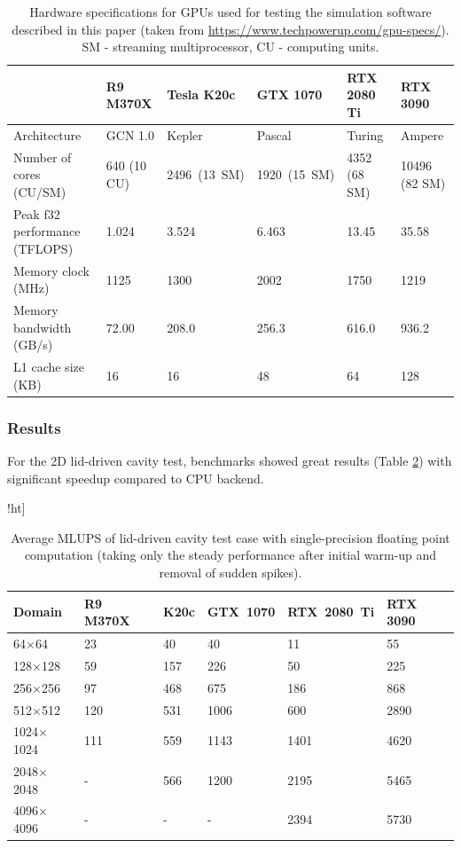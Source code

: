 \begin{table}[!ht]
	\centering
	\begin{tabular}{ |p{4.9cm}||p{2cm}|p{2cm}|p{2cm}|p{2.1cm}|p{2.2cm}| }
		\hline
		& R9 M370X & Tesla K20c & GTX 1070 & RTX 2080 Ti & RTX 3090 \\
		\hline
		Architecture   & GCN 1.0 & Kepler & Pascal  & Turing &  Ampere  \\
		Number of cores (CU/SM)   & 640 (10 CU) & 2496~(13~SM) & 1920~(15~SM)   &  4352 (68 SM) &  10496 (82 SM) \\
		Peak f32 performance (TFLOPS)   & 1.024  & 3.524 & 6.463  & 13.45 &  35.58 \\
		Memory clock (MHz)   & 1125  & 1300 & 2002   & 1750 &   1219 \\
		Memory bandwidth (GB/s)   & 72.00  & 208.0  & 256.3   & 616.0 &   936.2 \\
		L1 cache size (KB)   & 16  & 16  & 48   & 64 &   128 \\
		\hline
	\end{tabular}
	\caption{Hardware specifications for GPUs used for testing the simulation software described in this paper (taken from \url{https://www.techpowerup.com/gpu-specs/}). SM - streaming multiprocessor, CU - computing units.}
	\label{tab:gpus}
\end{table}

\subsubsection{Results}

For the 2D lid-driven cavity test, benchmarks showed great results (Table \ref{tab:lid-mlups-all}) with significant speedup compared to CPU backend.

\begin{table}!ht]
	\centering
	\begin{tabular}{ |p{1.7cm}||p{1.6cm}|p{0.9cm}|p{1.5cm}|p{1.7cm}|p{1.5cm}|  }
		\hline
		Domain & R9 M370X & K20c & GTX~1070 & RTX~2080~Ti & RTX 3090 \\
		\hline
		64$\times$64   & 23 & 40 & 40  & 11  & 55  \\
		128$\times$128   & 59 & 157 & 226  & 50   & 225  \\
		256$\times$256   & 97 & 468 & 675  & 186   & 868  \\
		512$\times$512   & 120 & 531 & 1006  & 600   & 2890  \\
		1024$\times$1024   & 111 & 559 & 1143   & 1401   & 4620  \\
		2048$\times$2048   & - & 566 & 1200  & 2195  & 5465  \\
		4096$\times$4096   & - & - & -  & 2394  & 5730  \\
		\hline
	\end{tabular}
	\caption{Average MLUPS of lid-driven cavity test case with single-precision floating point computation (taking only the steady performance after initial warm-up and removal of sudden spikes).}
	\label{tab:lid-mlups-all}
\end{table}

